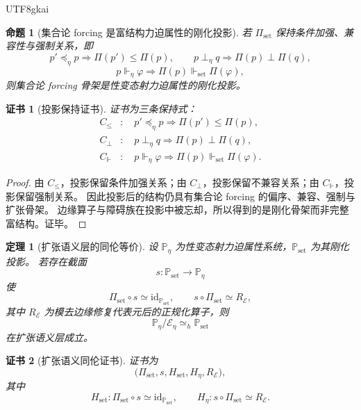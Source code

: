 \documentclass[12pt]{article}
\newtheorem{theorem}{定理}[section]
\newtheorem{proposition}{命题}[section]
\newtheorem{Certificate}{证书}[section]
\newcommand{\id}{\mathrm{id}}
\begin{document}
\begin{CJK*}{UTF8}{gkai}
\begin{proposition}[集合论 forcing 是富结构力迫属性的刚化投影]
\label{prop:tex50-forcing-projection}
若 $\Pi_{\mathrm{set}}$ 保持条件加强、兼容性与强制关系，即
\[
  p'\preceq_\eta p \Rightarrow \Pi(p')\le\Pi(p),
  \qquad
  p\perp_\eta q \Rightarrow \Pi(p)\perp\Pi(q),
\]
\[
  p\Vdash_\eta\varphi
  \Rightarrow
  \Pi(p)\Vdash_{\mathrm{set}}\Pi(\varphi),
\]
则集合论 forcing 骨架是性变态射力迫属性的刚化投影。
\end{proposition}

\begin{Certificate}[投影保持证书]
证书为三条保持式：
\[
\begin{aligned}
  C_{\le}&:\quad p'\preceq_\eta p\Rightarrow\Pi(p')\le\Pi(p),\\
  C_{\perp}&:\quad p\perp_\eta q\Rightarrow\Pi(p)\perp\Pi(q),\\
  C_{\Vdash}&:\quad p\Vdash_\eta\varphi\Rightarrow\Pi(p)\Vdash_{\mathrm{set}}\Pi(\varphi).
\end{aligned}
\]
\end{Certificate}

\begin{proof}
由 $C_{\le}$，投影保留条件加强关系；由 $C_{\perp}$，投影保留不兼容关系；由 $C_{\Vdash}$，投影保留强制关系。
因此投影后的结构仍具有集合论 forcing 的偏序、兼容、强制与扩张骨架。
边缘算子与障碍族在投影中被忘却，所以得到的是刚化骨架而非完整富结构。证毕。
\end{proof}

\begin{theorem}[扩张语义层的同伦等价]
\label{thm:tex50-forcing-homotopy-equivalence}
设 $\mathbb P_\eta$ 为性变态射力迫属性系统，$\mathbb P_{\mathrm{set}}$ 为其刚化投影。
若存在截面
\[
  s:\mathbb P_{\mathrm{set}}\to\mathbb P_\eta
\]
使
\[
  \Pi_{\mathrm{set}}\circ s\simeq\id_{\mathbb P_{\mathrm{set}}},
  \qquad
  s\circ\Pi_{\mathrm{set}}\simeq R_{\mathcal E},
\]
其中 $R_{\mathcal E}$ 为模去边缘修复代表元后的正规化算子，则
\[
  \mathbb P_\eta/\mathcal E_\eta
  \simeq_h
  \mathbb P_{\mathrm{set}}
\]
在扩张语义层成立。
\end{theorem}

\begin{Certificate}[扩张语义同伦证书]
证书为
\[
  \bigl(\Pi_{\mathrm{set}},s,H_{\mathrm{set}},H_{\eta},R_{\mathcal E}\bigr),
\]
其中
\[
  H_{\mathrm{set}}:\Pi_{\mathrm{set}}\circ s\simeq\id_{\mathbb P_{\mathrm{set}}},
  \qquad
  H_{\eta}:s\circ\Pi_{\mathrm{set}}\simeq R_{\mathcal E}.
\]
\end{Certificate}


\end{CJK*}
\end{document}
